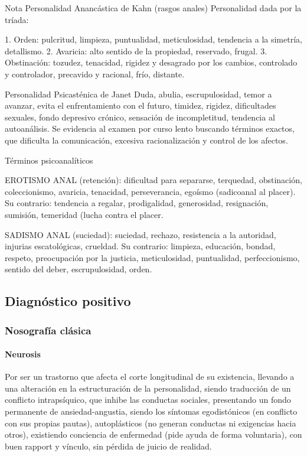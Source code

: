 Nota Personalidad Anancástica de Kahn (rasgos anales) Personalidad dada por la tríada:

1. Orden: pulcritud, limpieza, puntualidad, meticulosidad, tendencia a la simetría, detallismo.
2. Avaricia: alto sentido de la propiedad, reservado, frugal.
3. Obstinación: tozudez, tenacidad, rigidez y desagrado por los cambios, controlado y controlador, precavido y racional, frío, distante.

Personalidad Psicasténica de Janet Duda, abulia, escrupulosidad, temor a avanzar, evita el enfrentamiento con el futuro, timidez, rigidez, dificultades sexuales, fondo depresivo crónico, sensación de incompletitud, tendencia al autoanálisis. Se evidencia al examen por curso lento buscando términos exactos, que dificulta la comunicación, excesiva racionalización y control de los afectos.

Términos psicoanalíticos

EROTISMO ANAL (retención): dificultad para separarse, terquedad, obstinación, coleccionismo, avaricia, tenacidad, perseverancia, egoísmo (sadicoanal al placer). Su contrario: tendencia a regalar, prodigalidad, generosidad, resignación, sumisión, temeridad (lucha contra el placer.

SADISMO ANAL (suciedad): suciedad, rechazo, resistencia a la autoridad, injurias escatológicas, crueldad. Su contrario: limpieza, educación, bondad, respeto, preocupación por la justicia, meticulosidad, puntualidad, perfeccionismo, sentido del deber, escrupulosidad, orden.

\subsection*{Diagnóstico positivo}
\subsubsection{Nosografía clásica}
\paragraph{Neurosis}
Por ser un trastorno que afecta el corte longitudinal de su existencia, llevando a una alteración en la estructuración de la personalidad, siendo traducción de un conflicto intrapsíquico, que inhibe las conductas sociales, presentando un fondo permanente de ansiedad-angustia, siendo los síntomas egodistónicos (en conflicto con sus propias pautas), autoplásticos (no generan conductas ni exigencias hacia otros), existiendo conciencia de enfermedad (pide ayuda de forma voluntaria), con buen rapport y vínculo, sin pérdida de juicio de realidad.
